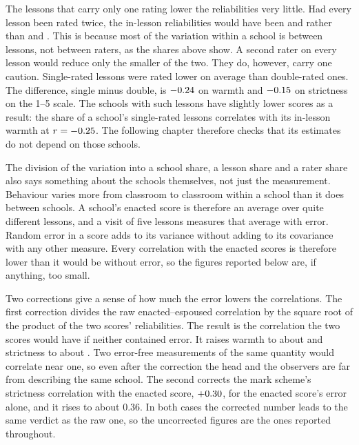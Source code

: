 The lessons that carry only one rating lower the reliabilities very little. Had every lesson been rated twice, the in-lesson
reliabilities would have been \RelWOneTwoRaters{} and \RelSOneTwoRaters{}
rather than \RelWLessons{} and \RelSLessons{}. This is because most of the variation within a school is between lessons, not between raters, as the shares above show. A second rater on every lesson would reduce only the smaller of the two. They do, however,
carry one caution. Single-rated lessons were rated lower on average than double-rated ones. The difference, single minus double, is $-0.24{}$ on warmth
and $-0.15{}$ on strictness on the 1--5 scale. The \SchoolsWithSingleRated{} schools with such lessons have
slightly lower scores as a result: the share of a school's single-rated lessons correlates with
its in-lesson warmth at $r = -0.25{}$. The following chapter therefore checks that its
estimates do not depend on those schools.

The division of the variation into a school share, a lesson share and a rater share also says
something about the schools themselves, not just the measurement. Behaviour varies more from
classroom to classroom within a school than it does between schools. A school's enacted score
is therefore an average over
quite different lessons, and a visit of five lessons measures that average with error. Random error in a score adds to its variance without adding to its covariance with any other measure. Every correlation with the enacted scores is therefore lower than it would be without error, so the figures reported below are, if anything, too small.

Two corrections give a sense of how much the error lowers the correlations. The first correction divides the raw enacted--espoused correlation by the square root of the product of the two scores' reliabilities. The result is the correlation the two scores would have if neither contained error. It raises warmth to about \DisSplitW{} and strictness to about \DisSplitS{}. Two error-free measurements of the same quantity would correlate near one, so even after the correction the head and the observers are far from describing the same school. The second corrects the mark scheme's strictness correlation with the enacted score, $+0.30$, for the enacted score's error alone, and it rises to about $0.36$. In both cases the corrected number leads to the same verdict as the raw one, so the uncorrected figures are the ones reported throughout.

